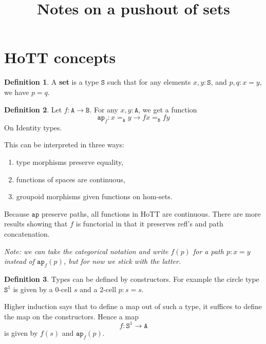 \message{ !name(notes.tex)}\documentclass[12pt]{amsart}
\newcommand{\from}{\colon}
\newcommand{\type}[1]{\mathtt{#1}}
\newcommand{\tin}{\colon}
\newcommand{\A}{\type{A}}
\newcommand{\B}{\type{B}}
\newcommand{\ap}{\type{ap}}
\theoremstyle{remark}
\theoremstyle{definition}
\newtheorem{defn}{Definition}
\begin{document}

	
\title{Notes on a pushout of sets}
\maketitle


\section{HoTT concepts}

\begin{defn} \label{def:set}
  A \textbf{set} is a type $ \type{S} $
  such that for any elements $ x,y \tin \type{S} $, and
  $ p,q \tin x = y $, we have $ p = q $.
\end{defn}

\begin{defn} \label{def:ap}
  Let $ f \from \A \to \B $.  For any
  $ x,y \tin \A $, we get a function
  \[
    \ap_f \from x =_\A y \to fx =_\B fy
  \]
  On Identity types.
	
  This can be interpreted in three ways:
  \begin{enumerate}
  \item type morphisms preserve equality,
  \item functions of spaces are continuous,
  \item groupoid morphisms given functions on hom-sets.
  \end{enumerate}
  Because $ \ap $ preserve paths, all functions in HoTT are
  continuous.  There are more results showing that $ f $ is functorial
  in that it preserves refl's and path concatenation.
	
  \emph{Note: we can take the categorical notation and write
    $ f ( p ) $ for a path $ p \tin x = y $ instead of
    $ \ap_f ( p ) $, but for now we stick with the latter.}
\end{defn}

\begin{defn} %
	Types can be defined by constructors.
	For example the circle type $ \type{S}^1 $
	is given by a $ 0 $-cell $s$ and 
	a $ 2 $-cell $ p \tin s = s $.
	
	Higher induction says that to define
	a map out of such a type, it suffices
	to define the map on the constructors.
	Hence a map 
	\[
		f \from \type{ S }^1 \to \A
	\] 
	is given by $ f ( s ) $ and 
	$\ap_f ( p )$.
\end{defn}
\end{document}
